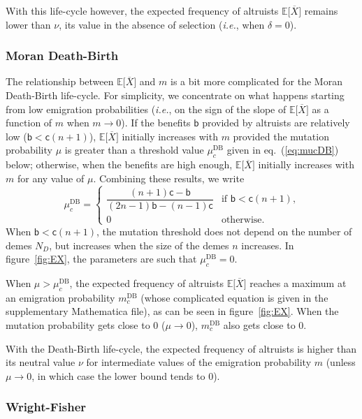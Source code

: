 \documentclass[11pt, letterpaper]{article}
\renewcommand{\eqref}[1]{\textup{{\normalfont eq.~(\ref{#1}}\normalfont)}}
\newcommand{\ie}{\textit{i.e.}}
\newcommand{\Esp}[1]{\mathbb{E}\big[ #1\big]}%
\newcommand{\bb}{\mathsf{b}}
\newcommand{\cc}{\mathsf{c}}
\newcommand{\DB}{\textrm{DB}}
\newcommand{\mutbias}{\nu}
\newcommand{\ndemes}{N_D}
\newcommand{\selstr}{\delta}
\begin{document}
With this life-cycle however, the expected frequency of altruists $\Esp{\overline{X}}$ remains lower than $\mutbias$, its value in the absence of selection (\ie, when $\selstr =0$). 

\subsubsection*{Moran Death-Birth}

The relationship between $\Esp{\overline{X}}$ and $m$ is a bit more complicated for the Moran Death-Birth life-cycle. For simplicity, we concentrate on what happens starting from low emigration probabilities (\ie, on the sign of the slope of $\Esp{\overline{X}}$ as a function of $m$ when $m\to 0$). If the benefits $\bb$ provided by altruists are relatively low ($\bb < \cc (n+1)$), $\Esp{\overline{X}}$ initially increases with $m$ provided the mutation probability $\mu$ is greater than a threshold value $\mu_c^{\DB}$ given in \eqref{eq:mucDB} below; otherwise, when the benefits are high enough, $\Esp{\overline{X}}$ initially increases with $m$ for any value of $\mu$. Combining these results, we write
\begin{equation}\label{eq:mucDB}
\mu_c^{\DB} = \begin{cases}
\dfrac{ (n+1) \cc - \bb}{ (2 n - 1) \bb - (n-1) \cc} & \textrm{if $\bb < \cc (n+1)$,} \\
%
0 & \textrm{otherwise. }
\end{cases}
\end{equation} 
%
When $\bb < \cc (n+1)$, the mutation threshold does not depend on the number of demes $\ndemes$, but increases when the size of the demes $n$ increases. In figure~\ref{fig:EX}, the parameters are such that $\mu_c^{\DB} = 0$. 

When $\mu > \mu_c^{\DB}$, the expected frequency of altruists $\Esp{\overline{X}}$ reaches a maximum at an emigration probability $m_c^{\DB}$ (whose complicated equation is given in the supplementary Mathematica file), as can be seen in figure~\ref{fig:EX}. When the mutation probability gets close to $0$ ($\mu \to 0$), $m_c^{\DB}$ also gets close to $0$.

With the Death-Birth life-cycle, the expected frequency of altruists is higher than its neutral value $\mutbias$ for intermediate values of the emigration probability $m$ (unless $\mu \to 0$, in which case the lower bound tends to $0$).

\subsubsection*{Wright-Fisher}
\end{document}
